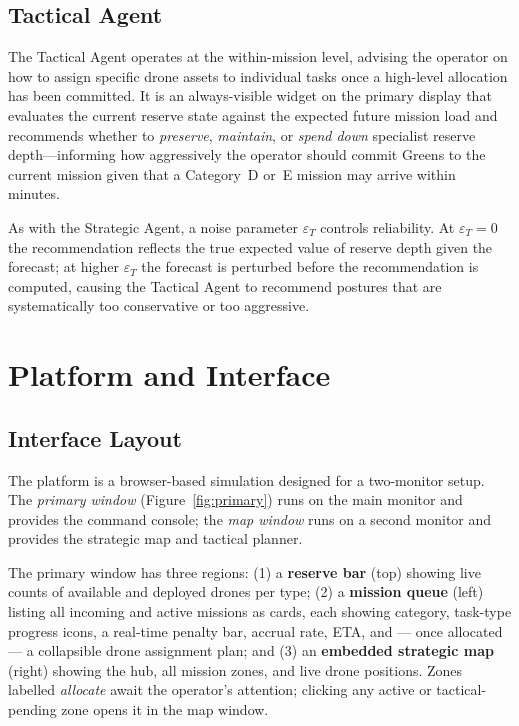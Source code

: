 \documentclass[10pt]{article}
\theoremstyle{definition}
\begin{document}
\subsection{Tactical Agent}\label{sec:tactical}

The Tactical Agent operates at the within-mission level, advising the operator on how to assign specific drone assets to individual tasks once a high-level allocation has been committed. It is an always-visible widget on the primary display that evaluates the current reserve state against the expected future mission load and recommends whether to \emph{preserve}, \emph{maintain}, or \emph{spend down} specialist reserve depth---informing how aggressively the operator should commit Greens to the current mission given that a Category~D or~E mission may arrive within minutes.

As with the Strategic Agent, a noise parameter $\varepsilon_T$ controls reliability. At $\varepsilon_T = 0$ the recommendation reflects the true expected value of reserve depth given the forecast; at higher $\varepsilon_T$ the forecast is perturbed before the recommendation is computed, causing the Tactical Agent to recommend postures that are systematically too conservative or too aggressive.

\section{Platform and Interface}\label{sec:interface}

\subsection{Interface Layout}

The platform is a browser-based simulation designed for a two-monitor setup. The \emph{primary window} (Figure~\ref{fig:primary}) runs on the main monitor and provides the command console; the \emph{map window} runs on a second monitor and provides the strategic map and tactical planner.

The primary window has three regions: (1) a \textbf{reserve bar} (top) showing live counts of available and deployed drones per type; (2) a \textbf{mission queue} (left) listing all incoming and active missions as cards, each showing category, task-type progress icons, a real-time penalty bar, accrual rate, ETA, and --- once allocated --- a collapsible drone assignment plan; and (3) an \textbf{embedded strategic map} (right) showing the hub, all mission zones, and live drone positions. Zones labelled \textit{allocate} await the operator's attention; clicking any active or tactical-pending zone opens it in the map window.
\end{document}

